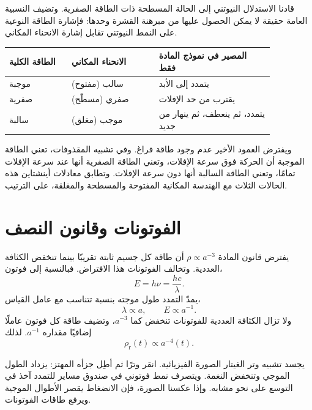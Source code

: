 قادنا الاستدلال النيوتني إلى الحالة المسطحة ذات الطاقة الصفرية. وتضيف النسبية العامة حقيقة لا يمكن الحصول عليها من مبرهنة القشرة وحدها: فإشارة الطاقة النوعية على النمط النيوتني تقابل إشارة الانحناء المكاني.
\begin{center}
\begin{tabular}{@{}>{\raggedright\arraybackslash}p{0.20\linewidth}
                    >{\raggedright\arraybackslash}p{0.29\linewidth}
                    >{\raggedright\arraybackslash}p{0.37\linewidth}@{}}
  \toprule
  الطاقة الكلية & الانحناء المكاني & المصير في نموذج المادة فقط \\
  \midrule
  موجبة & سالب (مفتوح) & يتمدد إلى الأبد \\
  صفرية & صفري (مسطّح) & يقترب من حد الإفلات \\
  سالبة & موجب (مغلق) & يتمدد، ثم ينعطف، ثم ينهار من جديد \\
  \bottomrule
\end{tabular}
\end{center}
ويفترض العمود الأخير عدم وجود طاقة فراغ. وفي تشبيه المقذوفات، تعني الطاقة الموجبة أن الحركة فوق سرعة الإفلات، وتعني الطاقة الصفرية أنها عند سرعة الإفلات تمامًا، وتعني الطاقة السالبة أنها دون سرعة الإفلات. وتطابق معادلات أينشتاين هذه الحالات الثلاث مع الهندسة المكانية المفتوحة والمسطحة والمغلقة، على الترتيب.

\section{الفوتونات وقانون النصف}

يفترض قانون المادة \(\rho\propto a^{-3}\) أن طاقة كل جسيم ثابتة تقريبًا بينما تنخفض الكثافة العددية. وتخالف الفوتونات هذا الافتراض. فبالنسبة إلى فوتون،
\begin{equation}
  E=h\nu=\frac{hc}{\lambda}.
\end{equation}
يمدّ التمدد طول موجته بنسبة تتناسب مع عامل القياس،
\begin{equation}
  \lambda\propto a,
  \qquad E\propto a^{-1}.
\end{equation}
ولا تزال الكثافة العددية للفوتونات تنخفض كما \(a^{-3}\)، وتضيف طاقة كل فوتون عاملًا إضافيًا مقداره \(a^{-1}\). لذلك
\begin{equation}
  \boxed{\rho_{\mathrm r}(t)\propto a^{-4}(t)}.
  \label{eq:l09-radiation-dilution}
\end{equation}

يجسد تشبيه وتر الغيتار الصورة الفيزيائية. انقر وترًا ثم أطِل جزأه المهتز: يزداد الطول الموجي وتنخفض النغمة. ويتصرف نمط فوتوني في صندوق مساير للتمدد آخذ في التوسع على نحو مشابه. وإذا عكسنا الصورة، فإن الانضغاط يقصر الأطوال الموجية ويرفع طاقات الفوتونات.

